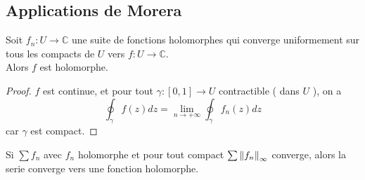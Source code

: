 \documentclass[../main.tex]{subfiles}
\begin{document}
\subsection{Applications de Morera}
\begin{thm}
	Soit $f_n: U\to \mathbb{C}$ une suite de fonctions holomorphes qui converge uniformement sur tous les compacts de $U$ vers $f:U\to \mathbb{C}$.\\
	Alors $f$ est holomorphe.
\end{thm}
\begin{proof}
	$f$ est continue, et pour tout $\gamma: [ 0,1] \to U$ contractible ( dans $U$ ), on a 
	\[ 
		\oint_{\gamma} f( z) dz = \lim_{n \to  + \infty} \oint_\gamma f_n( z) dz
	\]
	car $\gamma$ est compact.
\end{proof}
\begin{crly}
Si $\sum f_n$ avec $f_n$ holomorphe et pour tout compact $\sum \left\lVert f_n \right\rVert_{ \infty } $ converge, alors la serie converge vers une fonction holomorphe.
\end{crly}
\end{document}
